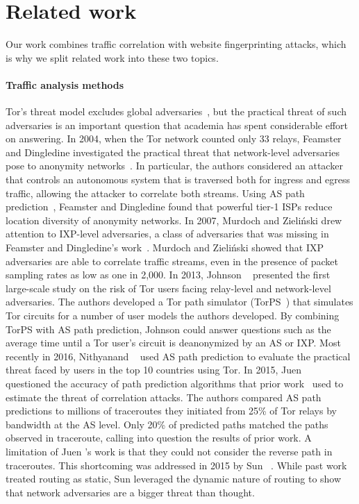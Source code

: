 \section{Related work}
\label{sec:related_work}
Our work combines traffic correlation with website fingerprinting attacks,
which is why we split related work into these two topics.

\paragraph{Traffic analysis methods}
Tor's threat model excludes global adversaries~\cite{Dingledine2004a}, but the
practical threat of such adversaries is an important question that academia has
spent considerable effort on answering.  In 2004, when the Tor network counted
only 33 relays, Feamster and Dingledine investigated the practical threat that
network-level adversaries pose to anonymity networks~\cite{Feamster2004a}.  In
particular, the authors considered an attacker that controls an autonomous
system that is traversed both for ingress and egress traffic, allowing the
attacker to correlate both streams.  Using AS path prediction~\cite{Gao2001a},
Feamster and Dingledine found that powerful tier-1 ISPs reduce location
diversity of anonymity networks.  In 2007, Murdoch and Zieli\'{n}ski drew
attention to IXP-level adversaries, a class of adversaries that was missing in
Feamster and Dingledine's work~\cite{Murdoch2007a}.  Murdoch and Zieli\'{n}ski
showed that IXP adversaries are able to correlate traffic streams, even in the
presence of packet sampling rates as low as one in 2,000.  In 2013, Johnson
\ea~\cite{Johnson2013a} presented the first large-scale study on the risk of Tor
users facing relay-level and network-level adversaries.  The authors developed a
Tor path simulator (TorPS~\cite{TorPS}) that simulates Tor circuits for a number
of user models the authors developed.  By combining TorPS with AS path
prediction, Johnson \ea could answer questions such as the average time until a
Tor user's circuit is deanonymized by an AS or IXP.  Most recently in 2016,
Nithyanand \ea~\cite{Nithyanand2016a} used AS path prediction to evaluate the
practical threat faced by users in the top 10 countries using Tor.  In 2015,
Juen \ea~\cite{Juen2015a} questioned the accuracy of path prediction algorithms
that prior work~\cite{Johnson2013a,Feamster2004a} used to estimate the threat of
correlation attacks.  The authors compared AS path predictions to millions of
traceroutes they initiated from 25\% of Tor relays by bandwidth at the AS level.
Only 20\% of predicted paths matched the paths observed in traceroute, calling
into question the results of prior work.  A limitation of Juen \ea's work is
that they could not consider the reverse path in traceroutes.  This shortcoming
was addressed in 2015 by Sun \ea~\cite{Sun2015a}.  While past work treated
routing as static, Sun \ea leveraged the dynamic nature of routing to show that
network adversaries are a bigger threat than thought.

